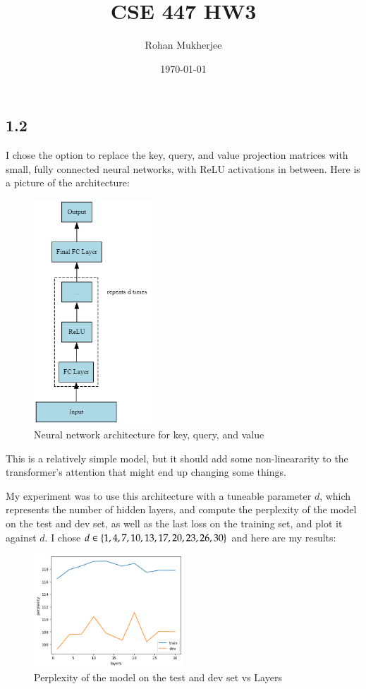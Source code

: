 \documentclass[12pt]{article}
\title{CSE 447 HW3}
\date{\today}
\author{Rohan Mukherjee}
\theoremstyle{definitionstyle}
\newcommand{\SET}[1]{\Set{\mskip-\medmuskip #1 \mskip-\medmuskip}}
\begin{document}
    \maketitle
    \subsection*{1.2}
    I chose the option to replace the key, query, and value projection matrices with small, fully connected neural networks, with ReLU activations in between. Here is a picture of the architecture:
    \begin{figure}[H]
        \centering
        \includegraphics[width=0.4\textwidth]{nn.png}
        \caption{Neural network architecture for key, query, and value}
    \end{figure}

    This is a relatively simple model, but it should add some non-lineararity to the transformer's attention that might end up changing some things. 

    My experiment was to use this architecture with a tuneable parameter $d$, which represents the number of hidden layers, and compute the perplexity of the model on the test and dev set, as well as the last loss on the training set, and plot it against $d$. I chose $d \in \SET{1, 4, 7, 10, 13, 17, 20, 23, 26, 30}$ and here are my results:
    \begin{figure}[H]
        \centering
        \includegraphics[width=0.5\textwidth]{ppl_vs_layers.png}
        \caption{Perplexity of the model on the test and dev set vs Layers}
    \end{figure}
\end{document}
